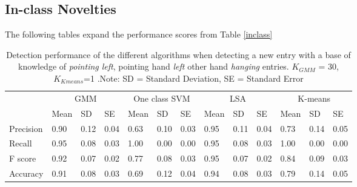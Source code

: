\clearpage

\subsection{In-class Novelties}

The following tables expand the performance scores from Table \ref{inclass}

\begin{table}[!ht]
	\footnotesize
	\renewcommand{\arraystretch}{2}
	\begin{tabular}{p{1.2cm}p{0.7cm}p{0.6cm}p{0.7cm}p{0.7cm}p{0.6cm}p{0.7cm}p{0.7cm}p{0.6cm}p{0.7cm}p{0.7cm}p{0.6cm}p{0.7cm}}
	\hline 
	 & \multicolumn{3}{c}{GMM}& \multicolumn{3}{c}{One class SVM}& \multicolumn{3}{c}{LSA}& \multicolumn{3}{c}{K-means} \\
	 & Mean    & SD & SE& Mean    & SD & SE& Mean    & SD & SE& Mean    & SD & SE \\
	\hline
	Precision  & 0.90 & 0.12 & 0.04 & 0.63 & 0.10 & 0.03 & 0.95 & 0.11 & 0.04 & 0.73 & 0.14 & 0.05       \\
	Recall  & 0.95 & 0.08 & 0.03 & 1.00 & 0.00 & 0.00 & 0.95 & 0.08 & 0.03 & 1.00 & 0.00 & 0.00    \\
	F score  & 0.92 & 0.07 & 0.02 & 0.77 & 0.08 & 0.03 & 0.95 & 0.07 & 0.02 & 0.84 & 0.09 & 0.03    \\
	Accuracy   & 0.91 & 0.08 & 0.03 & 0.69 & 0.12 & 0.04 & 0.94 & 0.08 & 0.03 & 0.79 & 0.14 & 0.05   \\
	\hline
	\end{tabular}
	\centering
	\caption[Novelty Detection perfomance for \emph{pointing left}, pointing hand \emph{left} other hand \emph{hanging} entries]{Detection performance of the different algorithms when detecting a new entry with a base of knowledge of \emph{pointing left}, pointing hand \emph{left} other hand \emph{hanging}  entries. $ K_{GMM} $ = 30, $ K_{Kmeans} $=1 .Note: SD = Standard Deviation, SE = Standard Error}
\end{table}

